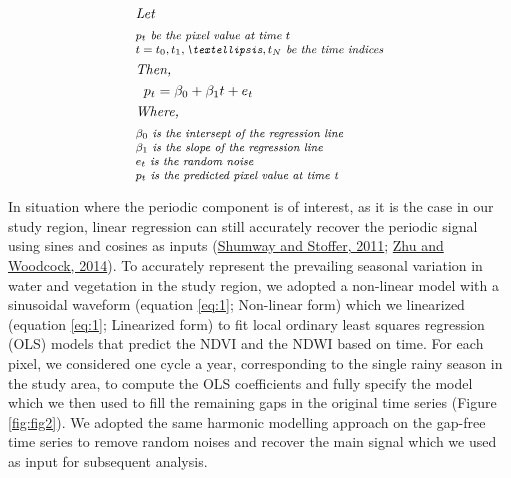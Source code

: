 \documentclass[utf8]{frontiersSCNS}
\begin{document}
\begin{equation}\label{eq:1}
\begin{aligned}[b]%
\text{\textit{Let}} \\
\omit \span \footnotesize\text{\textit{$p_t$ be the pixel value at time $t$}} \\[-5pt]
\omit \span \footnotesize\text{\textit{$t = t_0, t_1, …, t_N$ be the time indices}} \\
\omit \span \text{\textit{Then,}} \\
p_t &= \beta_0 + \beta_1 t + e_t \\
\omit \span \text{\textit{Where,}} \\
\omit \span \footnotesize\text{\textit{$\beta_0$ is the intersept of the regression line}} \\[-5pt]
\omit \span \footnotesize\text{\textit{$\beta_1$ is the slope of the regression line}} \\[-5pt]
\omit \span \footnotesize\text{\textit{$e_t$ is the random noise}} \\[-5pt]
\omit \span \footnotesize\text{\textit{$p_t$ is the predicted pixel value at time t}} \\[-5pt]
\end{aligned}
\end{equation}

In situation where the periodic component is of interest, as it is the
case in our study region, linear regression can still accurately recover
the periodic signal using sines and cosines as inputs
(\protect\hyperlink{ref-Shumway-and-Stoffer-2011}{Shumway and Stoffer,
2011}; \protect\hyperlink{ref-Zhu-and-Woodcock-2014}{Zhu and Woodcock,
2014}). To accurately represent the prevailing seasonal variation in
water and vegetation in the study region, we adopted a non-linear model
with a sinusoidal waveform (equation \ref{eq:1}; Non-linear form) which
we linearized (equation \ref{eq:1}; Linearized form) to fit local
ordinary least squares regression (OLS) models that predict the NDVI and
the NDWI based on time. For each pixel, we considered one cycle a year,
corresponding to the single rainy season in the study area, to compute
the OLS coefficients and fully specify the model which we then used to
fill the remaining gaps in the original time series (Figure
\ref{fig:fig2}). We adopted the same harmonic modelling approach on the
gap-free time series to remove random noises and recover the main signal
which we used as input for subsequent analysis.
\end{document}
